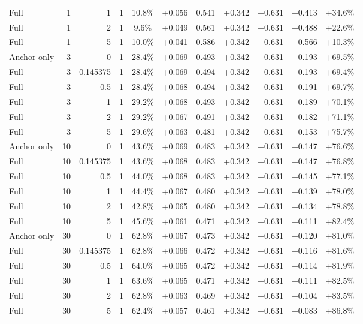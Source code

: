 \begin{table}[htbp]
\begin{tabular}{lrrrccccccc}
Full & 1 & 1 & 1 & 10.8\% & +0.056 & 0.541 & +0.342 & +0.631 & +0.413 & +34.6\% \\
Full & 1 & 2 & 1 & 9.6\% & +0.049 & 0.561 & +0.342 & +0.631 & +0.488 & +22.6\% \\
Full & 1 & 5 & 1 & 10.0\% & +0.041 & 0.586 & +0.342 & +0.631 & +0.566 & +10.3\% \\
Anchor only & 3 & 0 & 1 & 28.4\% & +0.069 & 0.493 & +0.342 & +0.631 & +0.193 & +69.5\% \\
Full & 3 & 0.145375 & 1 & 28.4\% & +0.069 & 0.494 & +0.342 & +0.631 & +0.193 & +69.4\% \\
Full & 3 & 0.5 & 1 & 28.4\% & +0.068 & 0.494 & +0.342 & +0.631 & +0.191 & +69.7\% \\
Full & 3 & 1 & 1 & 29.2\% & +0.068 & 0.493 & +0.342 & +0.631 & +0.189 & +70.1\% \\
Full & 3 & 2 & 1 & 29.2\% & +0.067 & 0.491 & +0.342 & +0.631 & +0.182 & +71.1\% \\
Full & 3 & 5 & 1 & 29.6\% & +0.063 & 0.481 & +0.342 & +0.631 & +0.153 & +75.7\% \\
Anchor only & 10 & 0 & 1 & 43.6\% & +0.069 & 0.483 & +0.342 & +0.631 & +0.147 & +76.6\% \\
Full & 10 & 0.145375 & 1 & 43.6\% & +0.068 & 0.483 & +0.342 & +0.631 & +0.147 & +76.8\% \\
Full & 10 & 0.5 & 1 & 44.0\% & +0.068 & 0.483 & +0.342 & +0.631 & +0.145 & +77.1\% \\
Full & 10 & 1 & 1 & 44.4\% & +0.067 & 0.480 & +0.342 & +0.631 & +0.139 & +78.0\% \\
Full & 10 & 2 & 1 & 42.8\% & +0.065 & 0.480 & +0.342 & +0.631 & +0.134 & +78.8\% \\
Full & 10 & 5 & 1 & 45.6\% & +0.061 & 0.471 & +0.342 & +0.631 & +0.111 & +82.4\% \\
Anchor only & 30 & 0 & 1 & 62.8\% & +0.067 & 0.473 & +0.342 & +0.631 & +0.120 & +81.0\% \\
Full & 30 & 0.145375 & 1 & 62.8\% & +0.066 & 0.472 & +0.342 & +0.631 & +0.116 & +81.6\% \\
Full & 30 & 0.5 & 1 & 64.0\% & +0.065 & 0.472 & +0.342 & +0.631 & +0.114 & +81.9\% \\
Full & 30 & 1 & 1 & 63.6\% & +0.065 & 0.471 & +0.342 & +0.631 & +0.111 & +82.5\% \\
Full & 30 & 2 & 1 & 62.8\% & +0.063 & 0.469 & +0.342 & +0.631 & +0.104 & +83.5\% \\
Full & 30 & 5 & 1 & 62.4\% & +0.057 & 0.461 & +0.342 & +0.631 & +0.083 & +86.8\% \\

\end{tabular}
\end{table}
